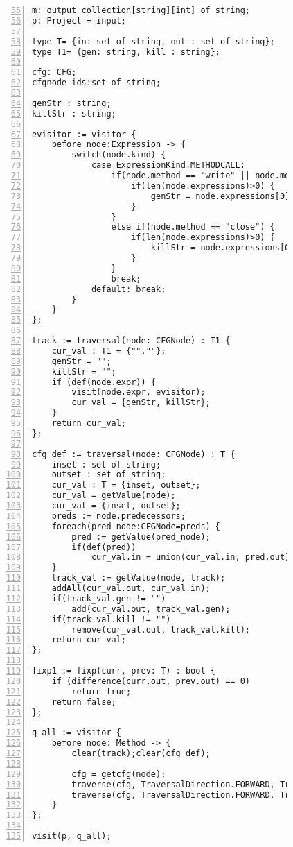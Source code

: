 \begin{figure}[ht!]
\begin{lstlisting}[numbers=left, tabsize=4, escapechar=@, caption={Resource status},label={lst:rs-code}, firstline = 55, firstnumber = 55] 
m: output collection[string][int] of string;
p: Project = input;

type T= {in: set of string, out : set of string};
type T1= {gen: string, kill : string};

cfg: CFG;
cfgnode_ids:set of string;

genStr : string;
killStr : string; 

evisitor := visitor {
	before node:Expression -> {
		switch(node.kind) {
			case ExpressionKind.METHODCALL: 
				if(node.method == "write" || node.method == "read" || node.method == "open") {
					if(len(node.expressions)>0) {
						genStr = node.expressions[0].variable;
					}
				}
				else if(node.method == "close") {
					if(len(node.expressions)>0) {
						killStr = node.expressions[0].variable;
					}
				}
  				break;
			default: break;
		}
	}
};

track := traversal(node: CFGNode) : T1 {
	cur_val : T1 = {"",""};
	genStr = "";
	killStr = "";
	if (def(node.expr)) {
		visit(node.expr, evisitor);
		cur_val = {genStr, killStr};
	}
	return cur_val;
};

cfg_def := traversal(node: CFGNode) : T {
	inset : set of string;
	outset : set of string;
	cur_val : T = {inset, outset};
	cur_val = getValue(node);
	cur_val = {inset, outset};
	preds := node.predecessors;
	foreach(pred_node:CFGNode=preds) {
		pred := getValue(pred_node);
		if(def(pred))
			cur_val.in = union(cur_val.in, pred.out);
	}
	track_val := getValue(node, track);
	addAll(cur_val.out, cur_val.in);
	if(track_val.gen != "")
		add(cur_val.out, track_val.gen);
	if(track_val.kill != "")
		remove(cur_val.out, track_val.kill);
	return cur_val;
};

fixp1 := fixp(curr, prev: T) : bool {
	if (difference(curr.out, prev.out) == 0)
		return true;	
	return false;
};

q_all := visitor {
	before node: Method -> {
		clear(track);clear(cfg_def);

		cfg = getcfg(node);
		traverse(cfg, TraversalDirection.FORWARD, TraversalKind.HYBRID, track);
		traverse(cfg, TraversalDirection.FORWARD, TraversalKind.HYBRID, cfg_def, fixp1);
	}
};

visit(p, q_all);
\end{lstlisting}
\end{figure}